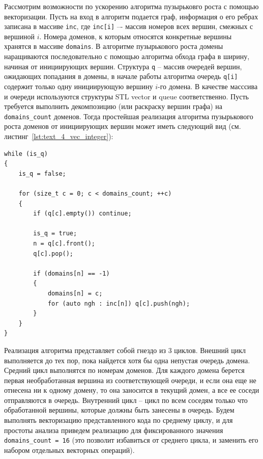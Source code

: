 Рассмотрим возможности по ускорению алгоритма пузырьковго роста с помощью векторизации.
Пусть на вход в алгоритм подается граф, информация о его ребрах записана в массиве \texttt{inc}, где \texttt{inc[i]} –- массив номеров всех вершин, смежных с вершиной $i$.
Номера доменов, к которым относятся конкретные вершины хранятся в массиве \texttt{domains}.
В алгоритме пузырькового роста домены наращиваются последовательно с помощью алгоритма обхода графа в ширину, начиная от инициирующих вершин.
Структура \texttt{q} -- массив очередей вершин, ожидающих попадания в домены, в начале работы алгоритма очередь \texttt{q[i]} содержит только одну инициирующую вершину $i$-го домена.
В качестве масссива и очереди используются структуры STL vector и queue соответственно.
Пусть требуется выполнить декомпозицию (или раскраску вершин графа) на \texttt{domains\_count} доменов.
Тогда простейшая реализация алгоритма пузырькового роста доменов от инициирующих вершин может иметь следующий вид (см. листинг~\ref{lst:text_4_vec_integer}):

\begin{lstlisting}[caption={Реализация алгоритма пузырькового роста доменов.},label={lst:text_4_vec_integer}]
while (is_q)
{
    is_q = false;

    for (size_t c = 0; c < domains_count; ++c)
    {
        if (q[c].empty()) continue;

        is_q = true;
        n = q[c].front();
        q[c].pop();

        if (domains[n] == -1)
        {
            domains[n] = c;
            for (auto ngh : inc[n]) q[c].push(ngh);
        }
    }
}
\end{lstlisting}

Реализация алгоритма представляет собой гнездо из 3 циклов.
Внешний цикл выполняется до тех пор, пока найдется хотя бы одна непустая очередь домена.
Средний цикл выполнятся по номерам доменов.
Для каждого домена берется первая необработанная вершина из соответствующей очереди, и если она еще не отнесена ни к одному домену, то она заносится в текущий домен, а все ее соседи отправляются в очередь.
Внутренний цикл -- цикл по всем соседям только что обработанной вершины, которые должны быть занесены в очередь.
Будем выполнять векторизацию представленного кода по среднему циклу, и для простоты анализа приведем реализацию для фиксированного значения \texttt{domains\_count = 16} (это позволит избавиться от среднего цикла, и заменить его набором отдельных векторных операций).

